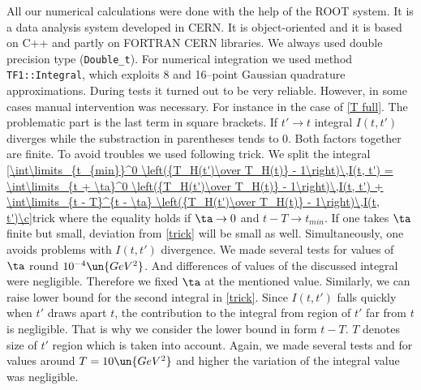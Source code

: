 All our numerical calculations were done with the help of the ROOT system. It is a data analysis system developed in CERN. It is object-oriented and it is based on C++ and partly on FORTRAN CERN libraries. We always used double precision type ({\tt Double\_t}). For numerical integration we used method {\tt TF1::Integral}, which exploits 8 and 16--point Gaussian quadrature approximations. During tests it turned out to be very reliable. However, in some cases manual intervention was necessary. For instance in the case of \equ{} \ref{T full}. The problematic part is the last term in square brackets. If $t'\to t$ integral $I(t, t')$ diverges while the substraction in parentheses tends to $0$. Both factors together are finite. To avoid troubles we used following trick. We split the integral
\eqref{\int\limits_{t_{min}}^0 \left({T_H(t')\over T_H(t)}  - 1\right)\,I(t, t') = \int\limits_{t + \ta}^0 \left({T_H(t')\over T_H(t)}  - 1\right)\,I(t, t') + \int\limits_{t - T}^{t - \ta} \left({T_H(t')\over T_H(t)}  - 1\right)\,I(t, t')\c}{trick}
where the equality holds if $\ta\to 0$ and $t - T\to t_{min}$. If one takes $\ta$ finite but small, deviation from \ref{trick} will be small as well. Simultaneously, one avoids problems with $I(t, t')$ divergence. We made several tests for values of $\ta$ round $10^{-4}\un{GeV^2}$. And differences of values of the discussed integral were negligible. Therefore we fixed $\ta$ at the mentioned value. Similarly, we can raise lower bound for the second integral in \ref{trick}. Since $I(t, t')$ falls quickly when $t'$ draws apart $t$, the contribution to the integral from region of $t'$ far from $t$ is negligible. That is why we consider the lower bound in form $t - T$. $T$ denotes size of $t'$ region which is taken into account. Again, we made several tests and for values around $T = 10 \un{GeV^2}$ and higher the variation of the integral value was negligible.

\iffalse
Let us summarize all the formulae describing Islam's model into compact form which was actually used for computation. During computer computation all quantities shrink to their values only. To keep their physical sense it essential to fix their units. We decided to measure impact parameter $b$ in$\un{fm}$, momentum transfer $t$ (and other quantities with dimension of mass) in$\un{GeV}$ and differential cross section $\d\sigma/\d t$ in$\un{mbarn/GeV^2}$. To reach this point one has to involve reduced Planck constant $\hbar$ and vacuum speed of light $c$ into the expressions. The complete set of formulae reads
\eqref{\eqalign{
T(s, t) &= T_D(s, t) + T_H(s, t)\c\qquad {\d\sigma\over\d t} = {\pi (\hbar c)^2\over s p^2}\, |T(s, t)|^2 \c\cr
T_D(s, t) &= f_D(s)\, \int\limits_0^\infty b\,\d b\, J_0\Big({b\sqrt{-t}\over\hbar c}\Big)\, \left[ {1\over 1 + e^{b-R\over a}} + {1\over 1 + e^{-{b+R\over a}}} - 1\right] \c\cr
T_H(s, t) &= f_H(s) \, {F^2(t)\over m^2 - t} \c\cr
}}{T comp}
where we factored out the only $s$-dependent factors
\eqref{f_D(s) = i\,{pW\over(\hbar c)^2} \left( 1 - \eta_0 - {c_0\over (s\, e^{-i\pi/2})^\si} \right) {1 + e^{-{R\over a}}\over 1-e^{-{R\over a}}} \c}{fD}
\eqref{f_H(s) =  \pm s \left[  \left(\eta_0 + {c_0\over (-i s)^\si}\right) \mp i \left(\la_0 + {-d_0\over (-i s)^\al}\right) \right]\, \Bigg(\hat\ga_0 + {\hat\ga_1\over (-i s)^{\hat\si}}\Bigg)\.}{fH}

\fi


{}
